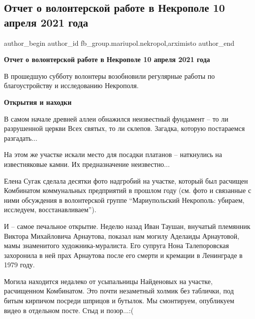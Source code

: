  
 
 
 
 

\subsection{Отчет о волонтерской работе в Некрополе 10 апреля 2021 года}
\label{sec:14_04_2021.fb.fb_group.mariupol.nekropol.1.otchet_volonter_rabota_10_aprelja}
 
\ifcmt
 author_begin
   author_id fb_group.mariupol.nekropol,arximisto
 author_end
\fi

\vspace{0.5cm}
\textbf{Отчет о волонтерской работе в Некрополе 10 апреля 2021 года}

В прошедшую субботу волонтеры возобновили регулярные работы по благоустройству
и исследованию Некрополя.

\textbf{Открытия и находки}

В самом начале древней аллеи обнажился неизвестный фундамент – то ли
разрушенной церкви Всех святых, то ли склепов. Загадка, которую постараемся
разгадать...

На этом же участке искали место для посадки платанов – наткнулись на
известняковые камни. Их предназначение неизвестно...

Елена Сугак сделала десятки фото надгробий на участке, который был расчищен
Комбинатом коммунальных предприятий в прошлом году (см. фото и связанные с ними
обсуждения в волонтерской группе \enquote{Мариупольский Некрополь: убираем, исследуем,
восстанавливаем}).

И – самое печальное открытие. Неделю назад Иван Таушан, внучатый племянник
Виктора Михайловича Арнаутова, показал нам могилу Аделаиды Арнаутовой, мамы
знаменитого художника-муралиста. Его супруга Нона Талепоровская захоронила в
ней прах Арнаутова после его смерти и кремации в Ленинграде в 1979 году.

Могила находится недалеко от усыпальницы Найденовых на участке, расчищенном
Комбинатом. Это почти незаметный холмик без таблички, под битым кирпичом
посреди шприцов и бутылок. Мы смонтируем, опубликуем видео в отдельном посте.
Стыд и позор...:(

